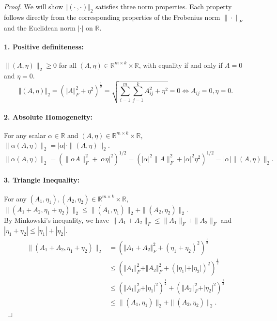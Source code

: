 \documentclass[12pt]{article}
\begin{document}
\begin{proof}
We will show $\Vert (\cdot\,,\cdot)\Vert_2$ satisfies three norm properties. Each property follows directly from the corresponding properties of the Frobenius norm $\|\cdot\|_F$ and the Euclidean norm $|\cdot|$ on $\mathbb{R}$.

\paragraph{1. Positive definiteness:} $\|(A, \eta)\|_2 \geq 0$ for all $(A, \eta) \in \mathbb{R}^{m \times k} \times \mathbb{R}$, with equality if and only if $A = 0$ and $\eta = 0$. 
$$\Vert (A,\eta) \Vert_2= (\Vert A \Vert_F^2+\eta^2)^{\frac{1}{2}}= \sqrt{{\sum_{i=1} ^m \sum_{j=1}^k A_{ij}^2} + \eta^2}=0 \iff A_{ij}=0,\eta=0.$$

\paragraph{2. Absolute Homogeneity:} For any scalar $\alpha \in \mathbb{R}$ and $(A, \eta) \in \mathbb{R}^{m \times k} \times \mathbb{R}$, $\|\alpha(A, \eta)\|_2 = |\alpha| \cdot \|(A, \eta)\|_2$.
$$\|\alpha(A, \eta)\|_2 = (\|\alpha A\|_F^2 + |\alpha\eta|^2)^{1/2} = (|\alpha|^2\|A\|_F^2 + |\alpha|^2\eta^2)^{1/2} = |\alpha|\|(A, \eta)\|_2.$$

\paragraph{3. Triangle Inequality:} For any $(A_1, \eta_1), (A_2, \eta_2) \in \mathbb{R}^{m \times k} \times \mathbb{R}$, $\|(A_1 + A_2, \eta_1 + \eta_2)\|_2 \leq \|(A_1, \eta_1)\|_2 + \|(A_2, \eta_2)\|_2$.\\
By Minkowski's inequality, we have $\|A_1 + A_2\|_F \leq \|A_1\|_F + \|A_2\|_F$ and $|\eta_1 + \eta_2| \leq |\eta_1| + |\eta_2|$.
\begin{equation*}
    \begin{aligned}
        \|(A_1 + A_2, \eta_1 + \eta_2)\|_2 &=\left(\Vert A_1+A_2 \Vert_F^2+(\eta_1+\eta_2)^2\right)^{\frac{1}{2}} \\
        & \le \left(\Vert A_1\Vert_F^2+\Vert A_2 \Vert_F^2+(\vert \eta_1\vert+\vert\eta_2\vert)^2\right)^{\frac{1}{2}} \\
        & \le \left(\Vert A_1\Vert_F^2+\vert \eta_1 \vert^2 \right)^{\frac{1}{2}} + \left(\Vert A_2\Vert_F^2+\vert \eta_2 \vert^2 \right)^{\frac{1}{2}} \\
        & \le \|(A_1, \eta_1)\|_2 + \|(A_2, \eta_2)\|_2.
    \end{aligned}
\end{equation*}
\end{proof}
\end{document}
